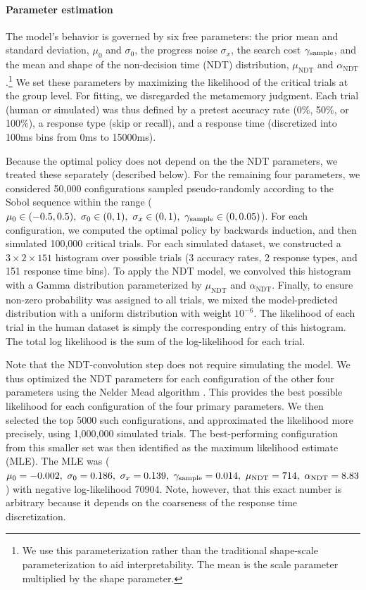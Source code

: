 \paragraph{Parameter estimation}

The model's behavior is governed by six free parameters: the prior mean and standard deviation, $\mu_0$ and $\sigma_0$, the progress noise $\sigma_x$, the search cost $\gamma_\text{sample}$, and the mean and shape of the non-decision time (NDT) distribution, $\mu_\text{NDT}$ and $\alpha_\text{NDT}$.\footnote{%
  We use this parameterization rather than the traditional shape-scale parameterization to aid interpretability. The mean is the scale parameter multiplied by the shape parameter.
} We set these parameters by maximizing the likelihood of the critical trials at the group level. For fitting, we disregarded the metamemory judgment. Each trial (human or simulated) was thus defined by a pretest accuracy rate (0\%, 50\%, or 100\%), a response type (skip or recall), and a response time (discretized into 100ms bins from 0ms to 15000ms). 

Because the optimal policy does not depend on the the NDT parameters, we treated these separately (described below). For the remaining four parameters, we considered 50,000 configurations sampled pseudo-randomly according to the Sobol sequence \citep{sobol1967distribution,bergstra2012random} within the range ($\mu_0 \in (-0.5, 0.5),\ \sigma_0 \in (0, 1),\ \sigma_x \in (0, 1),\ \gamma_\text{sample} \in (0, 0.05)$). For each configuration, we computed the optimal policy by backwards induction, and then simulated 100,000 critical trials. For each simulated dataset, we constructed a $3 \times 2 \times 151$ histogram over possible trials (3 accuracy rates, 2 response types, and 151 response time bins). To apply the NDT model, we convolved this histogram with a Gamma distribution parameterized by $\mu_\text{NDT}$ and $\alpha_\text{NDT}$. Finally, to ensure non-zero probability was assigned to all trials, we mixed the model-predicted distribution with a uniform distribution with weight $10^{-6}$. The likelihood of each trial in the human dataset is simply the corresponding entry of this histogram. The total log likelihood is the sum of the log-likelihood for each trial.

Note that the NDT-convolution step does not require simulating the model. We thus optimized the NDT parameters for each configuration of the other four parameters using the Nelder Mead algorithm \citep{nelder1965simplex}. This provides the best possible likelihood for each configuration of the four primary parameters. We then selected the top 5000 such configurations, and approximated the likelihood more precisely, using 1,000,000 simulated trials. The best-performing configuration from this smaller set was then identified as the maximum likelihood estimate (MLE). The MLE was (\(
    \mu_0 = -0.002,\ 
    \sigma_0 = 0.186,\ 
    \sigma_x = 0.139,\ 
    \samplecost = 0.014,\ 
    \mu_\text{NDT} = 714,\ 
    \alpha_\text{NDT} = 8.83
\)) with negative log-likelihood 70904. Note, however, that this exact number is arbitrary because it depends on the coarseness of the response time discretization.

